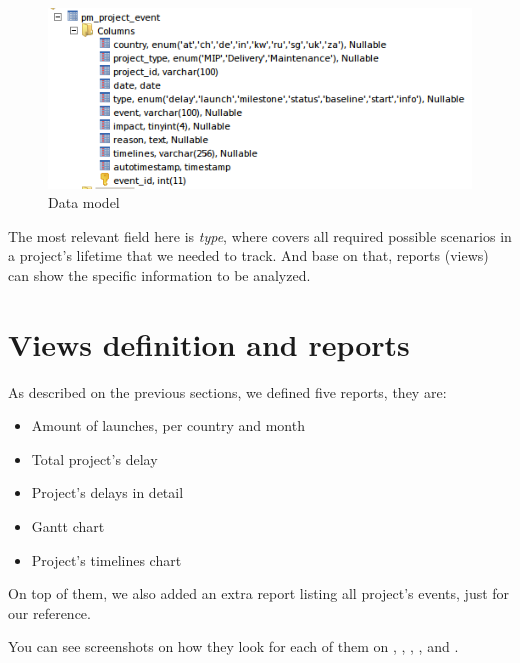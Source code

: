 \begin{figure}[ht!]
	\centering
   	\includegraphics[width=1\textwidth]{./resources/data_model.png}
   	\caption{Data model}
   	\label{f_data_model}
\end{figure}

The most relevant field here is \emph{type}, where covers all required possible
scenarios in a project's lifetime that we needed to track. And base on that, 
reports (views) can show the specific information to be analyzed.

\section{Views definition and reports}
As described on the previous sections, we defined five reports, they are:

\begin{itemize}
  \item Amount of launches, per country and month
  \item Total project's delay
  \item Project's delays in detail
  \item Gantt chart
  \item Project's timelines chart 
\end{itemize}

On top of them, we also added an extra report listing all project's events,
just for our reference.

You can see screenshots on how they look for each of them on
, ,
, ,
 and .

